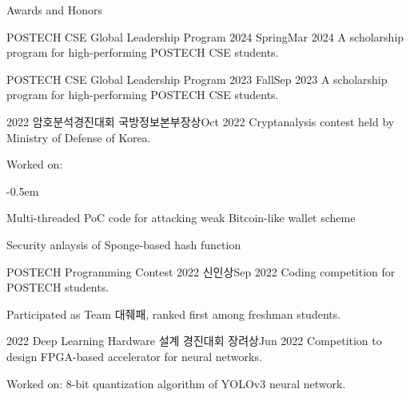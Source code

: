 \documentclass{resume}
\begin{document}
\begin{res-section}{Awards and Honors}
  \begin{res-subsection}{POSTECH CSE Global Leadership Program 2024 Spring}{Mar 2024}
    A scholarship program for high-performing POSTECH CSE students.
  \end{res-subsection}

  \begin{res-subsection}{POSTECH CSE Global Leadership Program 2023 Fall}{Sep 2023}
    A scholarship program for high-performing POSTECH CSE students.
  \end{res-subsection}

  \begin{res-subsection}{2022 암호분석경진대회 국방정보본부장상}{Oct 2022}
    Cryptanalysis contest held by Ministry of Defense of Korea.

    \item Worked on:
    \vspace{-0.5em}
    \begin{list}{--}{}
      \itemsep -0.5em
      \item Multi-threaded PoC code for attacking weak Bitcoin-like wallet scheme
      \item Security anlaysis of Sponge-based hash function
    \end{list}
  \end{res-subsection}

  \begin{res-subsection}{POSTECH Programming Contest 2022 신인상}{Sep 2022}
    Coding competition for POSTECH students.

    \item Participated as Team 대줴패, ranked first among freshman students.
  \end{res-subsection}

  \begin{res-subsection}{2022 Deep Learning Hardware 설계 경진대회 장려상}{Jun 2022}
    Competition to design FPGA-based accelerator for neural networks.

    \item Worked on: 8-bit quantization algorithm of YOLOv3 neural network.
  \end{res-subsection}
\end{res-section}
\end{document}
